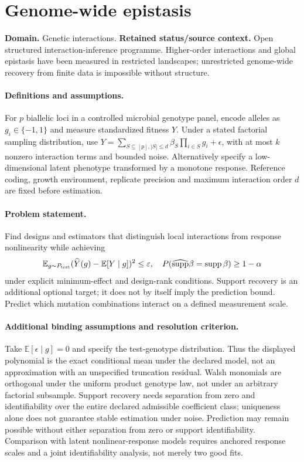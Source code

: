 \documentclass[11pt]{article}
\begin{document}
\section*{Genome-wide epistasis}
\label{prob:025}
\label{rank:18}
\par\smallskip

\noindent\textbf{Domain.} Genetic interactions. \quad \textbf{Retained status/source context.} Open structured interaction-inference programme. Higher-order interactions and global epistasis have been measured in restricted landscapes; unrestricted genome-wide recovery from finite data is impossible without structure.
\paragraph{Definitions and assumptions.} For $p$ biallelic loci in a controlled microbial genotype panel, encode alleles as $g_i\in\{-1,1\}$ and measure standardized fitness $Y$. Under a stated factorial sampling distribution, use $Y=\sum_{S\subseteq[p],|S|\leq d}\beta_S\prod_{i\in S}g_i+\epsilon$, with at most $k$ nonzero interaction terms and bounded noise. Alternatively specify a low-dimensional latent phenotype transformed by a monotone response. Reference coding, growth environment, replicate precision and maximum interaction order $d$ are fixed before estimation.
\paragraph{Problem statement.} Find designs and estimators that distinguish local interactions from response nonlinearity while achieving
\[
\mathbb{E}_{g\sim P_{\rm test}}(\widehat Y(g)-\mathbb{E}[Y\mid g])^2\leq\varepsilon,
\quad P(\widehat{\operatorname{supp}}\beta=\operatorname{supp}\beta)\geq1-\alpha
\]
under explicit minimum-effect and design-rank conditions. Support recovery is an additional optional target; it does not by itself imply the prediction bound. Predict which mutation combinations interact on a defined measurement scale.
\paragraph{Additional binding assumptions and resolution criterion.} Take $\mathbb{E}[\epsilon\mid g]=0$ and specify the test-genotype distribution. Thus the displayed polynomial is the exact conditional mean under the declared model, not an approximation with an unspecified truncation residual. Walsh monomials are orthogonal under the uniform product genotype law, not under an arbitrary factorial subsample. Support recovery needs separation from zero and identifiability over the entire declared admissible coefficient class; uniqueness alone does not guarantee stable estimation under noise. Prediction may remain possible without either separation from zero or support identifiability. Comparison with latent nonlinear-response models requires anchored response scales and a joint identifiability analysis, not merely two good fits.
\end{document}
